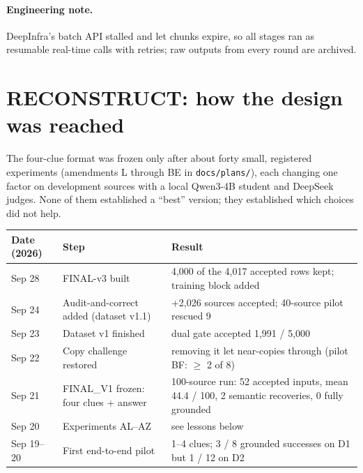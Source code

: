 \documentclass[11pt,a4paper]{article}
\newcommand{\code}[1]{\texttt{#1}}
\begin{document}
\paragraph{Engineering note.} DeepInfra's batch API stalled and let chunks expire, so all stages ran as resumable real-time calls with retries; raw outputs from every round are archived.

\section{RECONSTRUCT: how the design was reached}

The four-clue format was frozen only after about forty small, registered experiments (amendments L through BE in \code{docs/plans/}), each changing one factor on development sources with a local Qwen3-4B student and DeepSeek judges. None of them established a ``best'' version; they established which choices did not help.

\begin{table}[H]
\centering\small
\begin{tabularx}{\textwidth}{@{}p{1.9cm}p{4.6cm}L@{}}
\toprule
Date (2026) & Step & Result \\
\midrule
Sep 28 & FINAL-v3 built & 4,000 of the 4,017 accepted rows kept; training block added \\
Sep 24 & Audit-and-correct added (dataset v1.1) & +2,026 sources accepted; 40-source pilot rescued 9 \\
Sep 23 & Dataset v1 finished & dual gate accepted 1,991 / 5,000 \\
Sep 22 & Copy challenge restored & removing it let near-copies through (pilot BF: $\geq$ 2 of 8) \\
Sep 21 & FINAL\_V1 frozen: four clues + answer & 100-source run: 52 accepted inputs, mean 44.4 / 100, 2 semantic recoveries, 0 fully grounded \\
Sep 20 & Experiments AL--AZ & see lessons below \\
Sep 19--20 & First end-to-end pilot & 1--4 clues; 3 / 8 grounded successes on D1 but 1 / 12 on D2 \\
\bottomrule
\end{tabularx}
\end{table}
\end{document}
